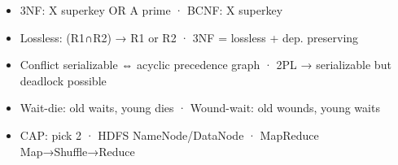 \begin{revbox}

\begin{itemize}
\tightlist
\item
  3NF: X superkey OR A prime · BCNF: X superkey
\item
  Lossless: (R1∩R2) → R1 or R2 · 3NF = lossless + dep. preserving
\item
  Conflict serializable ⇔ acyclic precedence graph · 2PL → serializable but deadlock possible
\item
  Wait-die: old waits, young dies · Wound-wait: old wounds, young waits
\item
  CAP: pick 2 · HDFS NameNode/DataNode · MapReduce Map→Shuffle→Reduce
\end{itemize}

\end{revbox}
